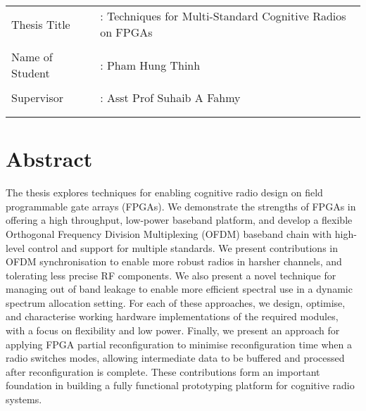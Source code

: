 \documentclass{article}
\begin{document}


\begin{table}[h]
	\begin{tabular}{ll}


{\large Thesis Title }&: {\Large Techniques for Multi-Standard Cognitive Radios on FPGAs}\\
&\\
{\large Name of Student} &: {\Large Pham Hung Thinh} \\
&\\
{\large Supervisor  }& : {\Large Asst Prof Suhaib A Fahmy}\\
& \\
& 
	\end{tabular}
\end{table}

\section*{Abstract}
\large{
The thesis explores techniques for enabling cognitive radio design on field programmable gate arrays (FPGAs). 
We demonstrate the strengths of FPGAs in offering a high throughput, low-power baseband platform, and develop a flexible Orthogonal Frequency Division Multiplexing (OFDM) baseband chain with high-level control and support for multiple standards. 
We present contributions in OFDM synchronisation to enable more robust radios in harsher channels, and tolerating less precise RF components. We also present a novel technique for managing out of band leakage to enable more efficient spectral use in a dynamic spectrum allocation setting. 
For each of these approaches, we design, optimise, and characterise working hardware implementations of the required modules, with a focus on 
flexibility and low power.
Finally, we present an approach for applying FPGA partial reconfiguration to minimise reconfiguration time when a radio switches modes, allowing intermediate data to be buffered and processed after reconfiguration is complete. 
These contributions form an important foundation in building a fully functional prototyping platform for cognitive radio systems.
}
\end{document}
